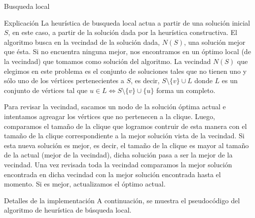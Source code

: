 \begin{section}{Busqueda local}
		\begin{subsection}{Explicación}
			La heurística de busqueda local actua a partir de una solución inicial $S$, en este caso, a partir de la solución dada por la heurística constructiva. El algoritmo busca en la vecindad de la solución dada, $N(S)$, una solución mejor que ésta. Si no encuentra ninguna mejor, nos encontramos en un óptimo local (de la vecindad) que tomamos como solución del algoritmo.
			La vecindad $N(S)$ que elegimos en este problema es el conjunto de soluciones tales que no tienen uno y sólo uno de los vértices pertenecientes a $S$, es decir, $S \setminus \{v\} \cup L$ donde $L$ es un conjunto de vértices tal que $u \in L \Longleftrightarrow S \setminus \{v\} \cup \{u\}$ forma un completo.

			Para revisar la vecindad, sacamos un nodo de la solución óptima actual e intentamos agreagar los vértices que no pertenecen a la clique. Luego, comparamos el tamaño de la clique que logramos contruir de esta manera con el tamaño de la clique correspondiente a la mejor solución vista de la vecindad. Si esta nueva solución es mejor, es decir, el tamaño de la clique es mayor al tamaño de la actual (mejor de la vecindad), dicha solución pasa a ser la mejor de la vecindad. Una vez revisada toda la vecindad comparamos la mejor solución encontrada en dicha vecindad con la mejor solución encontrada hasta el momento. Si es mejor, actualizamos el óptimo actual.
		\end{subsection}
		\begin{subsection}{Detalles de la implementación}
			A continuación, se muestra el pseudocódigo del algoritmo de heurística de búsqueda local.\\


\end{subsection}
\end{section}
